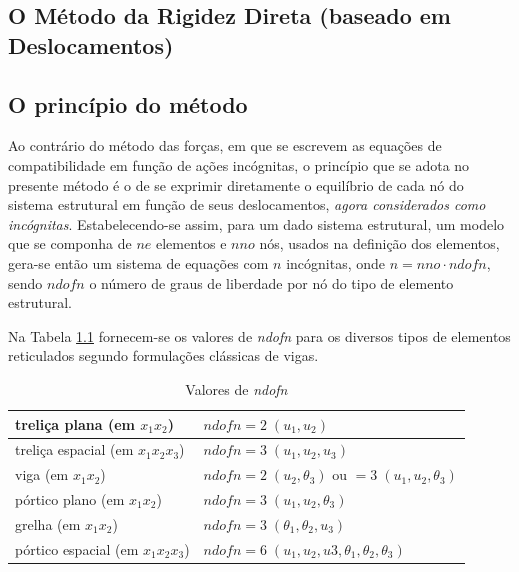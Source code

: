 ﻿\begin{frontmatter}
	\chapter{O Método da Rigidez Direta (baseado em Deslocamentos)}
\end{frontmatter}

\section{O princípio do método}

Ao contrário do método das forças, em que se escrevem as equações de compatibilidade em função de ações incógnitas, o princípio que se adota no presente método é o de se exprimir diretamente o equilíbrio de cada nó do sistema estrutural em função de seus deslocamentos, \textit{agora considerados como incógnitas}. Estabelecendo-se assim, para um dado sistema estrutural, um modelo que se componha de \(ne\) elementos e \(nno\) nós, usados na definição dos elementos, gera-se então um sistema de equações com \(n\) incógnitas, onde \(n=nno \cdot ndofn\), sendo \(ndofn\) o número de graus de liberdade por nó do tipo de elemento estrutural.

Na Tabela \ref{ndofn} fornecem-se os valores de \textit{ndofn} para os diversos tipos de elementos reticulados segundo formulações clássicas de vigas.

\begin{table}[ht]
	\centering
	\caption{Valores de \textit{ndofn}}	\label{ndofn}
	\begin{tabular}{|l|l|}
		\hline
		treliça plana (em \(x_1x_2\))       & \(ndofn\!=\!2 \; (u_1, u_2)\)                                          \\ \hline
		treliça espacial (em \(x_1x_2x_3\)) & \(ndofn\!=\!3 \;(u_1, u_2, u_3)\)                                      \\ \hline
		viga (em \(x_1x_2\))                & \(ndofn\!=\!2 \; (u_2, \theta_3)\) ou \(=\!3 \; (u_1, u_2, \theta_3)\) \\ \hline
		pórtico plano (em \(x_1x_2\))       & \(ndofn=3 \; (u_1, u_2, \theta_3)\)                                    \\ \hline
		grelha (em \(x_1x_2\))              & \(ndofn\!=\!3 \;(\theta_1, \theta_2, u_3)\)                            \\ \hline
		pórtico espacial (em \(x_1x_2x_3\)) & \(ndofn=6 \; (u_1, u_2, u3, \theta_1, \theta_2, \theta_3)\)            \\ \hline
	\end{tabular}
\end{table}

